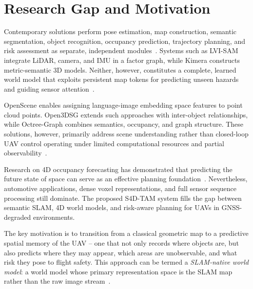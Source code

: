 \section{Research Gap and Motivation}
\label{sec:research_gap}

Contemporary solutions perform pose estimation, map construction, semantic segmentation, object recognition, occupancy prediction, trajectory planning, and risk assessment as separate, independent modules~\cite{feng2025survey, placed2022survey, ding2025survey}. Systems such as LVI-SAM integrate LiDAR, camera, and IMU in a factor graph, while Kimera constructs metric-semantic 3D models. Neither, however, constitutes a complete, learned world model that exploits persistent map tokens for predicting unseen hazards and guiding sensor attention~\cite{rosen2024scene}.

OpenScene enables assigning language-image embedding space features to point cloud points. Open3DSG extends such approaches with inter-object relationships, while Octree-Graph combines semantics, occupancy, and graph structure. These solutions, however, primarily address scene understanding rather than closed-loop UAV control operating under limited computational resources and partial observability~\cite{tian2024same, xiang2021customizable}.

Research on 4D occupancy forecasting has demonstrated that predicting the future state of space can serve as an effective planning foundation~\cite{yu2025driveoccworld, mei2025irwm, chen2024driveworld, zheng2024gaussianad}. Nevertheless, automotive applications, dense voxel representations, and full sensor sequence processing still dominate. The proposed S4D-TAM system fills the gap between semantic SLAM, 4D world models, and risk-aware planning for UAVs in GNSS-degraded environments.

The key motivation is to transition from a classical geometric map to a predictive spatial memory of the UAV -- one that not only records where objects are, but also predicts where they may appear, which areas are unobservable, and what risk they pose to flight safety. This approach can be termed a \emph{SLAM-native world model}: a world model whose primary representation space is the SLAM map rather than the raw image stream~\cite{pomianek2026s4dtam}.

